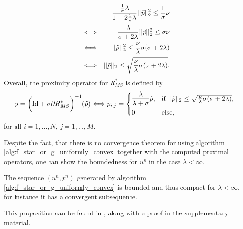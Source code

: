             \begin{eqnarray}
                &&\frac{\frac{1}{\sigma}\lambda}{1 + 2\frac{1}{\sigma}\lambda} ||\tilde{p}||_{2}^{2} \le \frac{1}{\sigma} \nu \notag \\
                &\Longleftrightarrow& \frac{\lambda}{\sigma + 2\lambda} ||\tilde{p}||_{2}^{2} \le \sigma \nu \notag \\
                &\Longleftrightarrow& ||\tilde{p}||_{2}^{2} \le \frac{\nu}{\lambda}\sigma(\sigma + 2\lambda) \notag \\
                &\Longleftrightarrow& ||\tilde{p}||_{2} \le \sqrt{\frac{\nu}{\lambda}\sigma(\sigma + 2\lambda)}. \label{eq:constraint_R_star}
            \end{eqnarray}
        Overall, the proximity operator for $R_{MS}^{\ast}$ is defined by
            \begin{equation}
                p = \bigg( \textnormal{Id} + \sigma \partial R_{MS}^{\ast} \bigg)^{-1}(\tilde{p}) \Longleftrightarrow p_{i,j} =
                    \begin{dcases*}
                        \frac{\lambda}{\lambda + \sigma} \tilde{p}, & \textnormal{if $||\tilde{p}||_{2} \le \sqrt{\frac{\nu}{\lambda}\sigma(\sigma + 2\lambda)}$,} \\
                        0 & \textnormal{else,}
                    \end{dcases*}
                \label{eq:proximity_operator_r_star}
            \end{equation}
        for all $i = 1, ..., N$, $j = 1, ..., M$.

        Despite the fact, that there is no convergence theorem for using algorithm \ref{alg:f_star_or_g_uniformly_convex} together with the computed proximal operators, one can show the boundedness for $u^{n}$ in the case $\lambda < \infty$.

        \begin{proposition}
        \label{prop:boundedness_realtime_algorithm}
            The sequence $(u^{n}, p^{n})$ generated by algorithm \ref{alg:f_star_or_g_uniformly_convex} is bounded and thus compact for $\lambda < \infty$, for instance it has a convergent subsequence.
        \end{proposition}

        This proposition can be found in \cite{Strekalovskiy-Cremers-eccv14}, along with a proof in the supplementary material.

